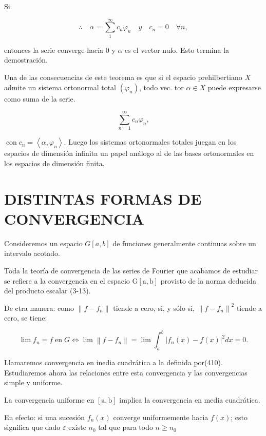 \documentclass[10pt]{article}
\theoremstyle{plain}
\theoremstyle{definition}
\theoremstyle{remark}
\begin{document}
Si

$$
\therefore \quad \alpha=\sum_{1}^{\infty} c_{n} \varphi_{n} \quad y \quad c_{n}=0 \quad \forall n,
$$


entonces la serie converge hacia 0 y $\alpha$ es el vector nulo. Esto termina la demostración.

Una de las consecuencias de este teorema es que si el espacio prehilbertiano $X$ admite un sistema ortonormal total $\left(\varphi_{n}\right)$, todo vec. tor $\alpha \in X$ puede expresarse como suma de la serie.

$$
\sum_{n=1}^{\infty} c_{n} \varphi_{n},
$$

$\operatorname{con} c_{n}=\left\langle\alpha, \varphi_{n}\right\rangle$. Luego los sistemas ortonormales totales juegan en los espacios de dimensión infinita un papel análogo al de las bases ortonormales en los espacios de dimensión finita.

\section*{DISTINTAS FORMAS DE CONVERGENCIA}
Consideremos un espacio $G[a, b]$ de funciones generalmente continuas sobre un intervalo acotado.

Toda la teoría de convergencia de las series de Fourier que acabamos de estudiar se refiere a la convergencia en el espacio $\mathrm{G}[\mathrm{a}, \mathrm{b}]$ provisto de la norma deducida del producto escalar (3-13).

De ctra manera: como $\left\|f-f_{n}\right\|$ tiende a cero, si, y sólo si, $\left\|f-f_{n}\right\|^{2}$ tiende a cero, se tiene:


\begin{equation*}
\lim f_{n}=f \operatorname{en} G \Longleftrightarrow \lim \left\|f-f_{n}\right\|=\lim \int_{a}^{b}\left|f_{n}(x)-f(x)\right|^{2} d x=0 . \tag{4-10}
\end{equation*}


Llamaremos convergencia en inedia cuadrática a la definida por(410).\\
Estudiaremos ahora las relaciones entre esta convergencia y las convergencias simple y uniforme.

La convergencia uniforme en $[\mathrm{a}, \mathrm{b}]$ implica la convergencia en media cuadrática.

En efecto: si una sucesión $f_{n}(x)$ converge uniformemente hacia $f(x)$; esto significa que dado $\varepsilon$ existe $n_{0}$ tal que para todo $n \geqslant n_{0}$
\end{document}
